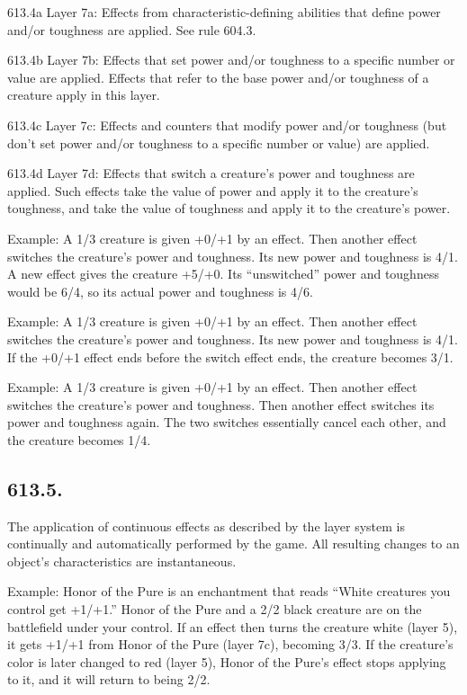 613.4a Layer 7a: Effects from characteristic-defining abilities that define power and/or toughness are applied. See rule 604.3.

613.4b Layer 7b: Effects that set power and/or toughness to a specific number or value are applied. Effects that refer to the base power and/or toughness of a creature apply in this layer.

613.4c Layer 7c: Effects and counters that modify power and/or toughness (but don’t set power and/or toughness to a specific number or value) are applied.

613.4d Layer 7d: Effects that switch a creature’s power and toughness are applied. Such effects take the value of power and apply it to the creature’s toughness, and take the value of toughness and apply it to the creature’s power.

Example: A 1/3 creature is given +0/+1 by an effect. Then another effect switches the creature’s power and toughness. Its new power and toughness is 4/1. A new effect gives the creature +5/+0. Its “unswitched” power and toughness would be 6/4, so its actual power and toughness is 4/6.

Example: A 1/3 creature is given +0/+1 by an effect. Then another effect switches the creature’s power and toughness. Its new power and toughness is 4/1. If the +0/+1 effect ends before the switch effect ends, the creature becomes 3/1.

Example: A 1/3 creature is given +0/+1 by an effect. Then another effect switches the creature’s power and toughness. Then another effect switches its power and toughness again. The two switches essentially cancel each other, and the creature becomes 1/4.

\subsection*{613.5.}
The application of continuous effects as described by the layer system is continually and automatically performed by the game. All resulting changes to an object’s characteristics are instantaneous.

Example: Honor of the Pure is an enchantment that reads “White creatures you control get +1/+1.” Honor of the Pure and a 2/2 black creature are on the battlefield under your control. If an effect then turns the creature white (layer 5), it gets +1/+1 from Honor of the Pure (layer 7c), becoming 3/3. If the creature’s color is later changed to red (layer 5), Honor of the Pure’s effect stops applying to it, and it will return to being 2/2.

